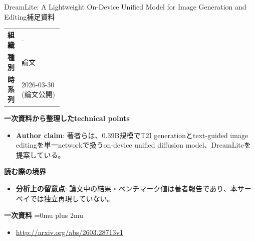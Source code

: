 \begin{technicalnote}{DreamLite: A Lightweight On-Device Unified Model for Image Generation and Editing}{補足資料}
\begingroup
\begin{tabularx}{\linewidth}{@{}>{\bfseries}p{0.22\linewidth}X@{}}
組織 & - \\
種別 & 論文 \\
時系列 & 2026-03-30 (論文公開) \\
\end{tabularx}
\smallskip
{\bfseries 一次資料から整理したtechnical points}
\begin{itemize}[leftmargin=1.5em,itemsep=0.35em]
\item \textbf{Author claim}: 著者らは、0.39B規模でT2I generationとtext-guided image editingを単一networkで扱うon-device unified diffusion model、DreamLiteを提案している。
\end{itemize}
\begin{minipage}{\linewidth}
{\bfseries 読む際の境界}
\begin{itemize}[leftmargin=1.5em,itemsep=0.35em]
\item \textbf{分析上の留意点}: 論文中の結果・ベンチマーク値は著者報告であり、本サーベイでは独立再現していない。
\end{itemize}
\begin{samepage}
{\bfseries 一次資料}
\begingroup\sloppy
\Urlmuskip=0mu plus 2mu\relax
\begin{itemize}[leftmargin=1.5em,itemsep=0.25em]
\item {\scriptsize\url{http://arxiv.org/abs/2603.28713v1}}
\end{itemize}
\endgroup
\end{samepage}
\end{minipage}
\endgroup
\end{technicalnote}
\medskip

